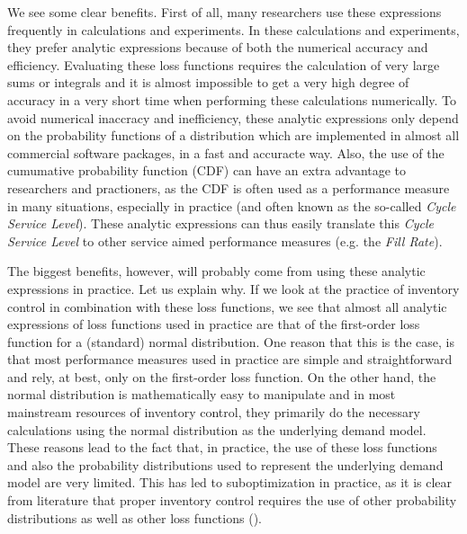 \documentclass{article}
\begin{document}
\begin{flushleft}
    We see some clear benefits.
    First of all, many researchers use these expressions frequently in calculations and experiments. In these calculations and experiments, they prefer analytic expressions because of both the numerical accuracy and efficiency.
    Evaluating these loss functions requires the calculation of very large sums or integrals and it is almost impossible to get a very high degree of accuracy in a very short time when performing these calculations numerically.
    To avoid numerical inaccracy and inefficiency, these analytic expressions only depend on the probability functions of a distribution which are implemented in almost all commercial software packages, in a fast and accuracte way.
    Also, the use of the cumumative probability function (CDF) can have an extra advantage to researchers and practioners, as the CDF is often used as a performance measure in many situations, especially in practice (and often known as the so-called \textit{Cycle Service Level}).
    These analytic expressions can thus easily translate this \textit{Cycle Service Level} to other service aimed performance measures (e.g. the \textit{Fill Rate}).
\end{flushleft}
\begin{flushleft}
    The biggest benefits, however, will probably come from using these analytic expressions in practice. Let us explain why.
    If we look at the practice of inventory control in combination with these loss functions, we see that almost all analytic expressions of loss functions used in practice are that of the first-order loss function for a (standard) normal distribution.
    One reason that this is the case, is that most performance measures used in practice are simple and straightforward and rely, at best, only on the first-order loss function.
    On the other hand, the normal distribution is mathematically easy to manipulate and in most mainstream resources of inventory control, they primarily do the necessary calculations using the normal distribution as the underlying demand model.
    These reasons lead to the fact that, in practice, the use of these loss functions and also the probability distributions used to represent the underlying demand model are very limited.
    This has led to suboptimization in practice, as it is clear from literature that proper inventory control requires the use of other probability distributions as well as other loss functions (\cite{RePEc:spr:isorms:978-3-319-15729-0}).
\end{flushleft}
\end{document}
